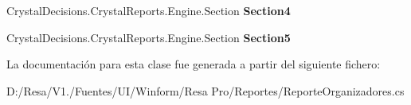 \begin{DoxyCompactItemize}
\item 
Crystal\+Decisions.\+Crystal\+Reports.\+Engine.\+Section {\bfseries Section4}\hspace{0.3cm}{\ttfamily  [get]}\label{class_resa___pro_1_1_reportes_1_1_reporte_organizadores_ac9d91d1ec5afdd78b08837c40ebc2c60}

\item 
Crystal\+Decisions.\+Crystal\+Reports.\+Engine.\+Section {\bfseries Section5}\hspace{0.3cm}{\ttfamily  [get]}\label{class_resa___pro_1_1_reportes_1_1_reporte_organizadores_a142df1a201ed336e6c67ebafa9b263b6}

\end{DoxyCompactItemize}


La documentación para esta clase fue generada a partir del siguiente fichero\+:\begin{DoxyCompactItemize}
\item 
D\+:/\+Resa/\+V1./\+Fuentes/\+U\+I/\+Winform/\+Resa Pro/\+Reportes/Reporte\+Organizadores.\+cs\end{DoxyCompactItemize}
